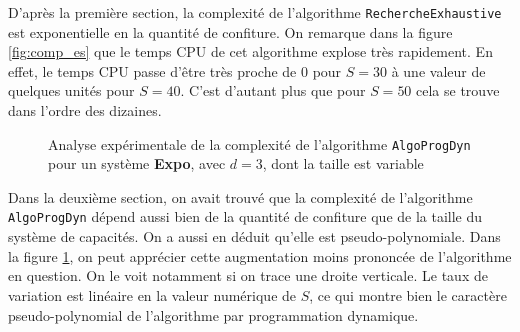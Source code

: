 \documentclass[12pt,a4paper]{article}
\begin{document}
D'apr\`es la premi\`ere section, la complexit\'e de l'algorithme \texttt{RechercheExhaustive} est exponentielle en la quantit\'e de confiture. On remarque dans la figure \ref{fig:comp_es} que le temps CPU de cet algorithme explose tr\`es rapidement. En effet, le temps CPU passe d'\^etre tr\`es proche de 0 pour $S=30$ \`a une valeur de quelques unit\'es pour $S=40$. C'est d'autant plus que pour $S=50$ cela se trouve dans l'ordre des dizaines. 

 \begin{figure}[!h]
  \centering
  \captionsetup{justification=centering}
  \caption[Analyse exp\'erimentale de \texttt{AlgoProgDyn}]{Analyse exp\'erimentale de la complexit\'e de l'algorithme \texttt{AlgoProgDyn} pour un syst\`eme {\bfseries Expo}, avec $d=3$, dont la taille est variable}
  \label{fig:comp_dp}
\end{figure}

\newpage

Dans la deuxi\`eme section, on avait trouv\'e que la complexit\'e de l'algorithme \texttt{AlgoProgDyn} d\'epend aussi bien de la quantit\'e de confiture que de la taille du syst\`eme de capacit\'es. On a aussi en d\'eduit qu'elle est pseudo-polynomiale. Dans la figure \ref{fig:comp_dp}, on peut appr\'ecier cette augmentation moins prononc\'ee de l'algorithme en question. On le voit notamment si on trace une droite verticale. Le taux de variation est lin\'eaire en la valeur num\'erique de $S$, ce qui montre bien le caract\`ere pseudo-polynomial de l'algorithme par programmation dynamique. 
\end{document}
